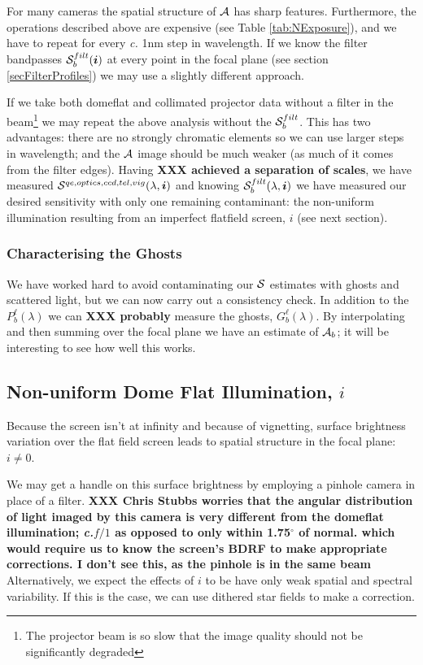 \documentclass[12pt]{article}
\renewcommand{\c}{\textit{c.}\xspace}
\newcommand{\ib}{{\boldsymbol i}}
\newcommand{\additive}{{\cal A}}
\newcommand{\qe}{{\cal S}}
\newcommand{\XXX}[1]{\textbf{XXX #1}\xspace}
\begin{document}
For many cameras the spatial structure of $\additive$ has sharp features.  Furthermore, the operations
described above are expensive (see Table \ref{tab:NExposure}), and we have to repeat for every \c 1nm step
in wavelength.  If we know
the filter bandpasses $\qe_b^{filt}(\ib)$ at every point in the focal plane (see section
\ref{secFilterProfiles}) we may use a slightly different approach.

If we take both domeflat and collimated projector data without a filter in the beam\footnote{
  The projector beam is so slow that the
  image quality should not be significantly degraded} we may repeat
the above analysis without the $\qe_b^{filt}$.  This has two advantages: there are
no strongly chromatic elements so we can use larger steps in wavelength;  and the $\additive$
image should be much weaker (as much of it comes from the filter edges).  Having \XXX{achieved a
separation of scales}, we have measured
$\qe^{qe, optics, ccd, tel, vig}(\lambda, \ib)$ and knowing $\qe_b^{filt}(\lambda, \ib)$ we have
measured our desired sensitivity with only one remaining contaminant: the non-uniform illumination
resulting from an imperfect flatfield screen, $i$ (see next section).

\subsubsection{Characterising the Ghosts}

We have worked hard to avoid contaminating our $\qe$ estimates with ghosts and scattered light, but
we can now carry out a consistency check.  In addition to the $P_b^\ell(\lambda)$ we can \XXX{probably}
measure the ghosts, $G_b^\ell(\lambda)$.  By interpolating and then summing over the focal plane
we have an estimate of $\additive_b$;  it will be interesting to see how well this works.

\subsection{Non-uniform Dome Flat Illumination, \texorpdfstring{$i$}{i}}

Because the screen isn't at infinity and because of vignetting, surface brightness variation over
the flat field screen leads to spatial structure in the focal plane: $i \ne 0$.

We may get a handle on this surface brightness by employing a pinhole camera in place of a
filter.
\XXX{Chris Stubbs worries that the angular distribution of light imaged by this camera
  is very different from the domeflat illumination; \c $f/1$ as opposed to only within 1.75$^\circ$ of normal.
  which would require us to know the screen's BDRF to make appropriate corrections.  I don't see this,
  as the pinhole is in the same beam}
Alternatively, we expect the effects of $i$ to be have only weak spatial and spectral variability.  If this
is the case, we can use dithered star fields to make a correction.
\end{document}
